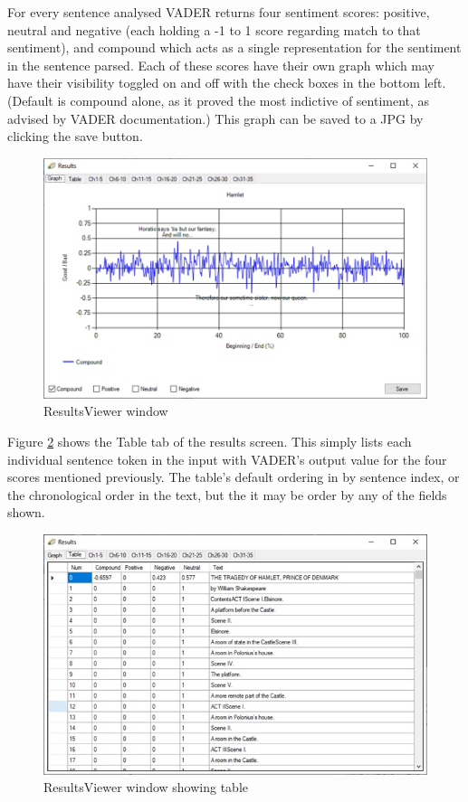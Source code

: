 \documentclass{article}
\begin{document}
        For every sentence analysed VADER returns four sentiment scores: positive, neutral and negative (each holding a -1 to 1 score regarding match to that sentiment), and compound which acts as a single representation for the sentiment in the sentence parsed. Each of these scores have their own graph which may have their visibility toggled on and off with the check boxes in the bottom left. (Default is compound alone, as it proved the most indictive of sentiment, as advised by VADER documentation.) This graph can be saved to a JPG by clicking the save button.
        \begin{figure}[H]
            \includegraphics[width=1\textwidth]{Misc/resultsviewer}
            \caption{ResultsViewer window}
            \label{fig:resultsviewer}
        \end{figure}
        Figure \ref{fig:resultstable} shows the Table tab of the results screen. This simply lists each individual sentence token in the input with VADER’s output value for the four scores mentioned previously. The table’s default ordering in by sentence index, or the chronological order in the text, but the it may be order by any of the fields shown.
        \begin{figure}[H]
            \includegraphics[width=1\textwidth]{Misc/resultstable}
            \caption{ResultsViewer window showing table}
            \label{fig:resultstable}
        \end{figure}
\end{document}
